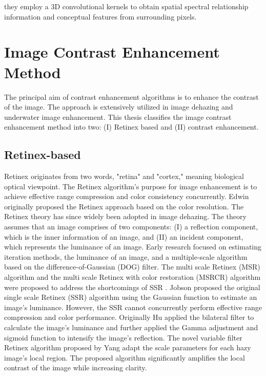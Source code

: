 \documentclass[doctor,english,listoffigures,listoftables]{thesis-uestc}
\begin{document}
they employ a 3D convolutional kernels to obtain spatial spectral relationship information and conceptual features from surrounding pixels. 
\section{Image Contrast Enhancement Method}
The principal aim of contrast enhancement algorithms is to enhance the contrast of the image. The approach is extensively utilized in image dehazing and underwater image enhancement. This thesis classifies the image contrast enhancement method into two: (I) Retinex based and (II) contrast enhancement. 

\subsection{Retinex-based}
Retinex originates from two words, "retina" and "cortex," meaning biological optical viewpoint. The Retinex algorithm's purpose for image enhancement is to achieve effective range compression and color consistency concurrently. Edwin originally proposed the Retinex approach based on the color resolution. The Retinex theory has since widely been adopted in image dehazing. The theory assumes that an image comprises of two components: (I) a reflection component, which is the inner information of an image, and (II) an incident component, which represents the luminance of an image. Early research focused on estimating iteration methods, the luminance of an image, and a multiple-scale algorithm based on the difference-of-Gaussian (DOG) filter. The multi scale Retinex (MSR) algorithm and the multi scale Retinex with color restoration (MSRCR)
algorithm were proposed to address the shortcomings of SSR . Jobson proposed the original single scale Retinex (SSR) algorithm using the Gaussian function to estimate an image's luminance. However, the SSR cannot concurrently perform effective range compression and color performance. Originally Hu applied the bilateral filter to calculate the image's luminance and further applied the Gamma adjustment and sigmoid function to intensify the image's reflection. The novel variable filter Retinex algorithm proposed by Yang adapt the scale parameters for each hazy image's local region. The proposed algorithm significantly amplifies the local contrast of the image while increasing clarity. 
\end{document}
